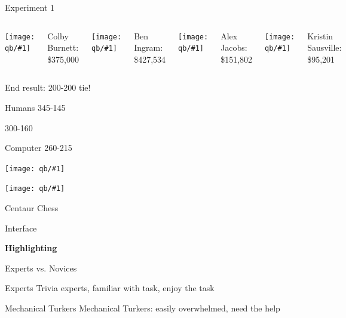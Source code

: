 \documentclass[compress]{beamer}
\newcommand{\fsi}[2]{
\begin{frame}[plain]
\vspace*{-1pt}
\makebox[\linewidth]{\texttt{[image: \#1]}}
\begin{center}
#2
\end{center}
\end{frame}
}
\newcommand{\gfxq}[2]{
\begin{center}
	\texttt{[image: qb/\#1]}
\end{center}
}
\begin{document}
\begin{frame}{Experiment 1}

		\begin{columns}
				\gfxq{colby_jeo}{1.0}
                                Colby Burnett:
                                \$375,000
				\gfxq{ben_jeo}{1.0}
                                Ben Ingram:
                                \$427,534
				\gfxq{alex_jeo}{1.0}
                                Alex Jacobs: \$151,802
				\gfxq{kristin_jeo}{1.0}
                                Kristin Sausville: \$95,201
		\end{columns}

                \pause


                \begin{center}
                End result: 200-200 tie!
                \end{center}

\end{frame}

\fsi{qb/hsnct1}{}
\fsi{qb/nasat}{Humans 345-145}
\fsi{qb/jennings_handshake}{300-160}
\fsi{qb/hsnct_2017}{Computer 260-215}


\begin{frame}[plain]
\gfxq{seattle_crowd}{.5}
\gfxq{chicago_crowd}{.5}
\end{frame}

\fsi{qb/boring_dot_products}{}

\fsi{simtrans/centaur-chess}{Centaur Chess}


\fsi{qb/augment/screenshot_all}{Interface}

\fsi{qb/augment/screenshot_guesses}{}

\fsi{qb/augment/screenshot_highlight}{{\bf Highlighting}}

\fsi{qb/augment/screenshot_evidence}{}

\begin{frame}{Experts vs. Novices}

 \begin{block}{Experts}
   Trivia experts, familiar with task, enjoy the task
 \end{block}

 \begin{block}{Mechanical Turkers}
   Mechanical Turkers: easily overwhelmed, need the help
 \end{block}

\end{frame}
\end{document}

